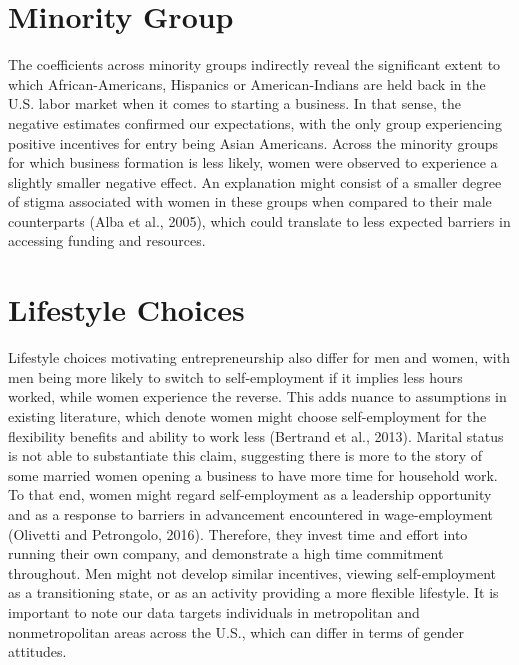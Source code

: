 \section{Minority Group}

The coefficients across minority groups indirectly reveal the significant extent to which African-Americans, Hispanics or American-Indians are held back in the U.S. labor market when it comes to starting a business. In that sense, the negative estimates confirmed our expectations, with the only group experiencing positive incentives for entry being Asian Americans. Across the minority groups for which business formation is less likely, women were observed to experience a slightly smaller negative effect. An explanation might consist of a smaller degree of stigma associated with women in these groups when compared to their male counterparts (Alba et al., 2005), which could translate to less expected barriers in accessing funding and resources. 

\section{Lifestyle Choices}
Lifestyle choices motivating entrepreneurship also differ for men and women, with men being more likely to switch to self-employment if it implies less hours worked, while women experience the reverse. This adds nuance to assumptions in existing literature, which denote women might choose self-employment for the flexibility benefits and ability to work less (Bertrand et al., 2013). Marital status is not able to substantiate this claim, suggesting there is more to the story of some married women opening a business to have more time for household work. To that end, women might regard self-employment as a leadership opportunity and as a response to barriers in advancement encountered in wage-employment (Olivetti and Petrongolo, 2016). Therefore, they invest time and effort into running their own company, and demonstrate a high time commitment throughout. Men might not develop similar incentives, viewing self-employment as a transitioning state, or as an activity providing a more flexible lifestyle. It is important to note our data targets individuals in metropolitan and nonmetropolitan areas across the U.S., which can differ in terms of gender attitudes. 


